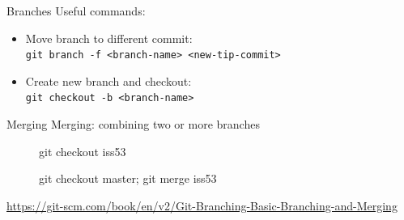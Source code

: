 \begin{frame}{Branches}
	Useful commands:
	\begin{itemize}
		\item Move  branch to different commit: \\ \texttt{git branch -f <branch-name> <new-tip-commit>}
		\item Create new branch and checkout: \\ \texttt{git checkout -b <branch-name>}
	\end{itemize}
\end{frame}
\begin{frame}[allowframebreaks]{Merging}
	Merging: combining two or more branches\\
	\begin{figure}
		\centering
		\caption{git checkout iss53}
	\end{figure}
\framebreak
	\begin{figure}
		\centering
		\caption{git checkout master; git merge iss53}
	\end{figure}
	\url{https://git-scm.com/book/en/v2/Git-Branching-Basic-Branching-and-Merging}
	
\end{frame}
